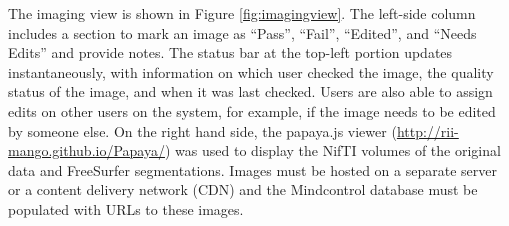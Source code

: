 The imaging view is shown in Figure \ref{fig:imagingview}. The left-side column includes a section to mark an image as ``Pass'', ``Fail'', ``Edited'', and ``Needs Edits'' and provide notes. The status bar at the top-left portion updates instantaneously, with information on which user checked the image, the quality status of the image, and when it was last checked. Users are also able to assign edits on other users on the system, for example, if the image needs to be edited by someone else. On the right hand side, the papaya.js viewer (\href{http://rii-mango.github.io/Papaya/}{http://rii-mango.github.io/Papaya/}) was used to display the NifTI volumes of the original data and FreeSurfer segmentations. Images must be hosted on a separate server or a content delivery network (CDN) and the Mindcontrol database must be populated with URLs to these images.
